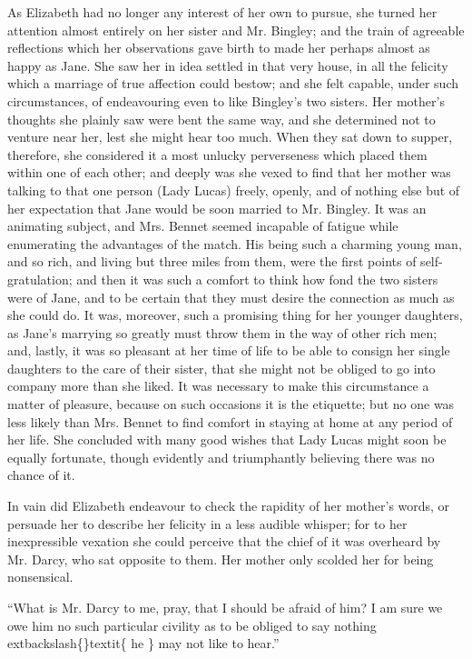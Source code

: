 \documentclass[10pt]{book}
\begin{document}
   As Elizabeth had no longer any interest of her own to pursue, she turned
her attention almost entirely on her sister and Mr. Bingley; and the
train of agreeable reflections which her observations gave birth to made
her perhaps almost as happy as Jane. She saw her in idea settled in that
very house, in all the felicity which a marriage of true affection could
bestow; and she felt capable, under such circumstances, of endeavouring
even to like Bingley’s two sisters. Her mother’s thoughts she plainly
saw were bent the same way, and she determined not to venture near her,
lest she might hear too much. When they sat down to supper, therefore,
she considered it a most unlucky perverseness which placed them within
one of each other; and deeply was she vexed to find that her mother was
talking to that one person (Lady Lucas) freely, openly, and of nothing
else but of her expectation that Jane would be soon married to Mr.
Bingley. It was an animating subject, and Mrs. Bennet
   seemed incapable
of fatigue while enumerating the advantages of the match. His being such
a charming young man, and so rich, and living but three miles from them,
were the first points of self-gratulation; and then it was such a
comfort to think how fond the two sisters were of Jane, and to be
certain that they must desire the connection as much as she could do. It
was, moreover, such a promising thing for her younger daughters, as
Jane’s marrying so greatly must throw them in the way of other rich men;
and, lastly, it was so pleasant at her time of life to be able to
consign her single daughters to the care of their sister, that she might
not be obliged to go into company more than she liked. It was necessary
to make this circumstance a matter of pleasure, because on such
occasions it is the etiquette; but no one was less likely than Mrs.
Bennet to find comfort in staying at home at any period of her life. She
concluded with many good wishes that Lady Lucas might soon be equally
fortunate, though evidently and triumphantly believing there was no
chance of it.
  

   In vain did Elizabeth endeavour to check the rapidity of her mother’s
words, or persuade her to describe her felicity in a less audible
whisper; for to her inexpressible vexation she could perceive that the
chief of it was overheard by Mr. Darcy, who sat opposite to them. Her
mother only scolded her for being nonsensical.
  

   “What is Mr. Darcy to me, pray, that I should be afraid of him? I am
sure we owe him no such particular civility as to be obliged to say
nothing
   	extbackslash\{\}textit\{
    he
   \}
   may not like to hear.”
  
\end{document}
